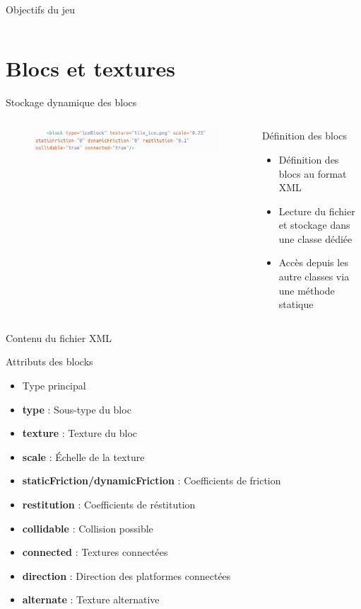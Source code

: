 \documentclass{beamer}
\begin{document}
{\begin{frame}{Objectifs du jeu}
\begin{columns}
    \end{columns}
\end{frame}

\section{Blocs et textures}
\begin{frame}{Stockage dynamique des blocs}
    \begin{columns}
            \begin{figure}
                \centering
                \includegraphics[width=1.0\textwidth]{XMLfile}
            \end{figure}
            \begin{block}{Définition des blocs}
                \begin{itemize}
                    \item[\bullet] Définition des blocs au format XML
                    \item[\bullet] Lecture du fichier et stockage dans une classe dédiée
                    \item[\bullet] Accès depuis les autre classes via une méthode statique
                \end{itemize}
            \end{block}
    \end{columns}
\end{frame}

\begin{frame}{Contenu  du fichier XML}
    \begin{block}{Attributs des blocks}
        \begin{itemize}
            \item[\bullet] Type principal
            \item[\bullet] \textbf{type} : Sous-type du bloc
            \item[\bullet] \textbf{texture} : Texture du bloc
            \item[\bullet] \textbf{scale} : Échelle de la texture
            \item[\bullet] \textbf{staticFriction/dynamicFriction} : Coefficients de friction
            \item[\bullet] \textbf{restitution} : Coefficients de réstitution
            \item[\bullet] \textbf{collidable} : Collision possible
            \item[\bullet] \textbf{connected} : Textures connectées
            \item[\bullet] \textbf{direction} : Direction des platformes connectées
            \item[\bullet] \textbf{alternate} : Texture alternative
        \end{itemize}
    \end{block}
\end{frame}

}
\end{document}
